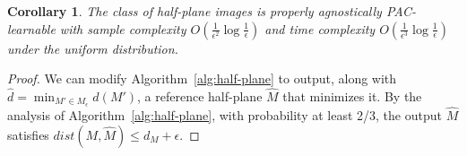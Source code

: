 \documentclass[11pt,english]{article}
\newtheorem{corollary}[theorem]{Corollary}
\numberwithin{figure}{section}
\newcommand{\dis}{dist}
\newcommand{\mydelta}{\epsilon} \newcommand{\bigdelta}{{\epsilon_0}} \newcommand{\dsquares}{d_{\rm squares}}
\newcommand{\dout}{\hat{d}}
\begin{document}
\ifnum{}
\begin{corollary}\label{cor:half-plane-agnostic-learner}
The class of half-plane images is properly agnostically PAC-learnable with sample complexity  $O(\frac{1}{\mydelta^2}\log\frac{1}{\mydelta})$ and time complexity $O(\frac{1}{\mydelta^{3}}\log \frac{1}{\mydelta})$ under the uniform distribution.
\end{corollary}
\begin{proof}
We can modify Algorithm~\ref{alg:half-plane} to output, along with $\dout=\min_{M'\in M_\mydelta}\dout(M')$, a reference half-plane $\hat{M}$ that minimizes it. By the analysis of Algorithm~\ref{alg:half-plane}, with probability at least 2/3, the output $\hat{M}$ satisfies $\dis(M,\hat{M})\leq d_M+\mydelta.$
\end{proof}
\fi
\end{document}
